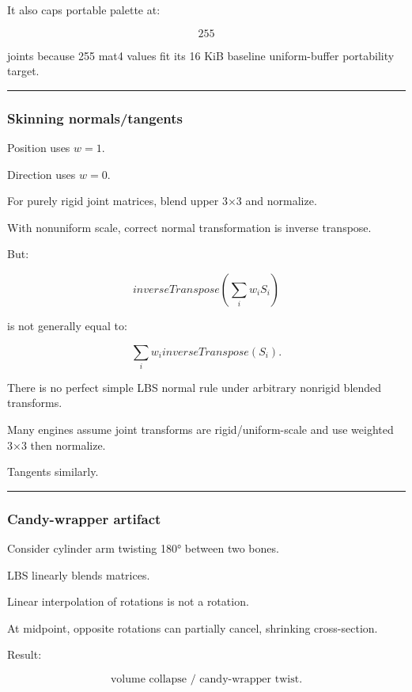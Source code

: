 It also caps portable palette at:

\[
255
\]

joints because 255 mat4 values fit its 16 KiB baseline uniform-buffer portability target.

\begin{center}\rule{0.5\linewidth}{0.5pt}\end{center}

\subsubsection{Skinning normals/tangents}\label{skinning-normalstangents}

Position uses \(w=1\).

Direction uses \(w=0\).

For purely rigid joint matrices, blend upper 3×3 and normalize.

With nonuniform scale, correct normal transformation is inverse transpose.

But:

\[
inverseTranspose
\left(
\sum_iw_iS_i
\right)
\]

is not generally equal to:

\[
\sum_iw_i
inverseTranspose(S_i).
\]

There is no perfect simple LBS normal rule under arbitrary nonrigid blended transforms.

Many engines assume joint transforms are rigid/uniform-scale and use weighted 3×3 then normalize.

Tangents similarly.

\begin{center}\rule{0.5\linewidth}{0.5pt}\end{center}

\subsubsection{Candy-wrapper artifact}\label{candy-wrapper-artifact}

Consider cylinder arm twisting 180° between two bones.

LBS linearly blends matrices.

Linear interpolation of rotations is not a rotation.

At midpoint, opposite rotations can partially cancel, shrinking cross-section.

Result:

\[
\boxed{
\text{volume collapse / candy-wrapper twist}.
}
\]

